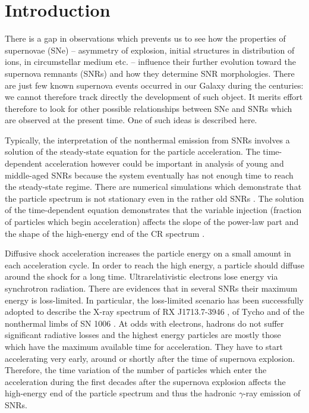 \documentclass{aa}
\newcommand\g{$\gamma$}
\begin{document}
\section{Introduction}

There is a gap in observations which prevents us to see how the properties of supernovae (SNe) -- asymmetry of explosion, initial structures in distribution of ions, in circumstellar medium  etc. -- influence their further evolution toward the supernova remnants (SNRs) and how they determine SNR morphologies. There are just few known supernova events occurred in our Galaxy during the centuries: we cannot therefore track directly the development of such object. It merits effort therefore to look for other possible relationships between SNe and SNRs which are observed at the present time. One of such ideas is described here. 

Typically, the interpretation of the nonthermal emission from SNRs involves a solution of the steady-state equation for the particle acceleration. The time-dependent acceleration however could be important in analysis of young and middle-aged SNRs because the system eventually has not enough time to reach the steady-state regime. There are numerical simulations which demonstrate that the particle spectrum is not stationary even in the rather old SNRs \citep{Brose-et-al-2016}.
The solution of the time-dependent equation demonstrates that the variable injection (fraction of particles which begin acceleration) affects the slope of the power-law part and the shape of the high-energy end of the CR spectrum \citep{Petruk-Kopytko-2016}. 

Diffusive shock acceleration increases the particle energy on a small amount in each acceleration cycle. In order to reach the high energy, a particle should diffuse around the shock for a long time. 
Ultrarelativistic electrons lose energy via synchrotron radiation. There are evidences that in several SNRs their maximum energy is loss-limited. In particular, the loss-limited scenario has been successfully adopted to describe the X-ray spectrum of RX J1713.7-3946 \citep{Zirak-Aha-2010,Tanaka-etal-2008}, of Tycho \citep{Morlino-Caprioli-2012} and of the nonthermal limbs of SN 1006 \citep{Miceli-etal-2013}. At odds with electrons, hadrons do not suffer significant radiative losses and the highest energy particles are mostly those which have the maximum available time for acceleration. They have to start accelerating very early, around or shortly after the time of supernova explosion. Therefore, the time variation of the number of particles which enter the acceleration during the first decades after the supernova explosion affects the high-energy end of the particle spectrum and thus the hadronic \g-ray emission of SNRs. 
\end{document}

